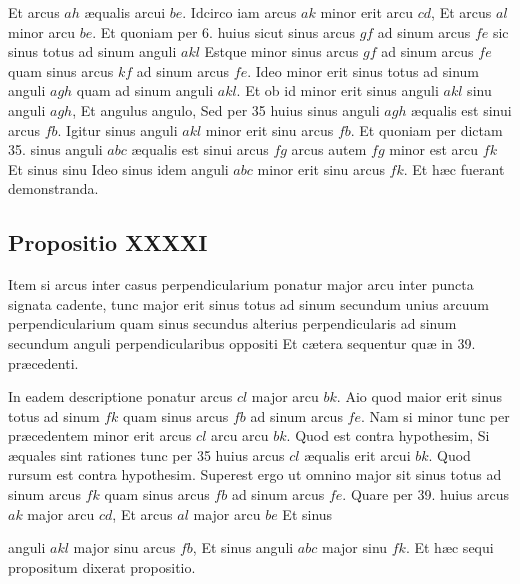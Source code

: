 \documentclass[11pt,a4paper]{article}
\begin{document}
Et arcus $ah$  æqualis arcui $be$. Idcirco iam arcus $ak$ minor erit arcu $cd$, Et arcus $al$ minor arcu $be$. Et quoniam per 6. huius sicut sinus arcus $gf$ ad sinum arcus $fe$ sic sinus totus ad sinum anguli $akl$  Estque minor sinus arcus $gf$ ad sinum arcus $fe$ quam sinus arcus $kf$ ad sinum arcus $fe$. Ideo minor erit sinus totus ad sinum anguli $agh$ quam ad sinum anguli $akl$. Et ob id minor erit sinus anguli $akl$ sinu anguli $agh$, Et angulus angulo, Sed per 35 huius sinus anguli $agh$ æqualis est sinui arcus $fb$. Igitur sinus anguli $akl$ minor erit sinu arcus $fb$. Et quoniam per dictam 35. sinus anguli $abc$ æqualis est sinui arcus $fg$ arcus autem $fg$ minor est arcu $fk$ Et sinus sinu Ideo sinus idem anguli $abc$ minor erit sinu arcus $fk$. Et hæc fuerant demonstranda.

\subsection*{Propositio XXXXI}

Item si arcus inter casus perpendicularium ponatur major arcu inter puncta signata cadente, tunc major erit sinus totus ad sinum secundum unius arcuum perpendicularium quam sinus secundus alterius perpendicularis ad sinum secundum anguli perpendicularibus oppositi Et cætera sequentur quæ in 39. præcedenti.

In eadem descriptione ponatur arcus $cl$ major arcu $bk$. Aio quod maior erit sinus totus ad sinum $fk$ quam sinus arcus $fb$ ad sinum arcus $fe$. Nam si minor tunc per præcedentem minor erit arcus $cl$ arcu arcu $bk$. Quod \struck{\ill{}} est contra hypothesim, Si æquales sint rationes tunc per 35 huius arcus $cl$ æqualis erit arcui $bk$. Quod rursum est contra hypothesim. Superest ergo ut omnino major sit sinus totus ad sinum arcus $fk$ quam sinus arcus $fb$ ad sinum arcus $fe$. Quare per 39. huius arcus $ak$ major arcu $cd$, Et arcus $al$ major arcu $be$ Et sinus

anguli $akl$ major sinu arcus $fb$, Et sinus anguli $abc$ major sinu $fk$. Et hæc sequi propositum dixerat propositio.
\end{document}
